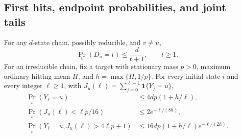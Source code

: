 \subsection{First hits, endpoint probabilities, and joint tails}

\begin{lemma}\label{lem:endpoint-tail}
For any $d$-state chain, possibly reducible, and $v\ne u$,
\begin{equation}\label{eq:p-first-hit}
 \Pr_v(D_u=t)\le\frac d{t+1},\qquad t\ge1.
\end{equation}
For an irreducible chain, fix a target with stationary mass $p>0$,
maximum ordinary hitting mean $H$, and $h=\max\{H,1/p\}$.
For every initial state $i$ and every integer $\ell\ge1$, with
$J_u(\ell)=\sum_{j=0}^{\ell-1}\mathbf1\{Y_j=u\}$,
\begin{align}
 \Pr_i(Y_\ell=u)&\le4dp(1+h/\ell),\label{eq:p-endpoint}\\
 \Pr_i(J_u(\ell)<\ell p/16)&\le2e^{-\ell/(8h)},\label{eq:p-lower-tail}\\
 \Pr_i(Y_\ell=u,J_u(\ell)>4\ell p+1)
 &\le16dp(1+h/\ell)e^{-\ell/(2h)}.\label{eq:p-joint-tail}
\end{align}
\end{lemma}
